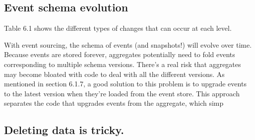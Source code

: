 \subsection{Event schema evolution}

Table 6.1 shows the different types of changes that can occur at each level.~\citep{richardson2018microservices}

With event sourcing, the schema of events (and snapshots!) will evolve over time.
Because events are stored forever, aggregates potentially need to fold events corresponding to multiple schema versions. There’s a real risk that aggregates may become
bloated with code to deal with all the different versions. As mentioned in section 6.1.7,
a good solution to this problem is to upgrade events to the latest version when they’re
loaded from the event store. This approach separates the code that upgrades events
from the aggregate, which simp

\subsection{Deleting data is tricky.}

